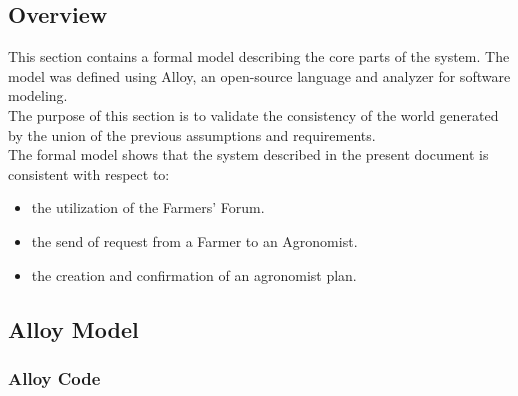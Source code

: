 \subsection{Overview}
\begin{flushleft}
This section contains a formal model describing the core parts of the system. The model was defined using Alloy, an open-source language and analyzer for software modeling.\\
The purpose of this section is to validate the consistency of the world generated by the union of the previous assumptions and requirements.\smallskip\\

The formal model shows that the system described in the present document is consistent with respect to:
\begin{itemize}
	\item the utilization of the Farmers' Forum.
	\item the send of request from a Farmer to an Agronomist.
	\item the creation and confirmation of an agronomist plan.
\end{itemize}

\end{flushleft}

\subsection{Alloy Model}

\subsubsection{Alloy Code}


